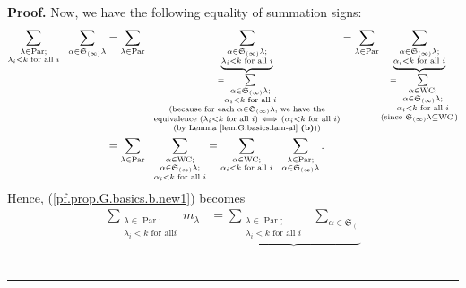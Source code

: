 \documentclass[numbers=enddot,12pt,final,onecolumn,notitlepage]{scrartcl}%
\theoremstyle{definition}
\newenvironment{proof}[1][Proof]{\noindent\textbf{#1.} }{\ \rule{0.5em}{0.5em}}
\let\sumnonlimits\sum
\renewcommand{\sum}{\sumnonlimits\limits}
\newenvironment{verlong}{}{}
\begin{document}
\begin{verlong}
\begin{proof}
Now, we have the following equality of summation signs:%
\begin{align*}
\sum_{\substack{\lambda\in\operatorname*{Par};\\\lambda_{i}<k\text{ for all
}i}}\ \ \sum_{\alpha\in\mathfrak{S}_{\left(  \infty\right)  }\lambda}  &
=\sum_{\lambda\in\operatorname*{Par}}\ \ \underbrace{\sum_{\substack{\alpha
\in\mathfrak{S}_{\left(  \infty\right)  }\lambda;\\\lambda_{i}<k\text{ for all
}i}}}_{\substack{=\sum_{\substack{\alpha\in\mathfrak{S}_{\left(
\infty\right)  }\lambda;\\\alpha_{i}<k\text{ for all }i}}\\\text{(because for
each }\alpha\in\mathfrak{S}_{\left(  \infty\right)  }\lambda\text{, we have
the}\\\text{equivalence }\left(  \lambda_{i}<k\text{ for all }i\right)
\ \Longleftrightarrow\ \left(  \alpha_{i}<k\text{ for all }i\right)
\\\text{(by Lemma \ref{lem.G.basics.lam-al} \textbf{(b)}))}}}=\sum_{\lambda
\in\operatorname*{Par}}\underbrace{\sum_{\substack{\alpha\in\mathfrak{S}%
_{\left(  \infty\right)  }\lambda;\\\alpha_{i}<k\text{ for all }i}%
}}_{\substack{=\sum_{\substack{\alpha\in\operatorname*{WC};\\\alpha
\in\mathfrak{S}_{\left(  \infty\right)  }\lambda;\\\alpha_{i}<k\text{ for all
}i}}\\\text{(since }\mathfrak{S}_{\left(  \infty\right)  }\lambda
\subseteq\operatorname*{WC}\text{)}}}\\
&  =\sum_{\lambda\in\operatorname*{Par}}\ \ \sum_{\substack{\alpha
\in\operatorname*{WC};\\\alpha\in\mathfrak{S}_{\left(  \infty\right)  }%
\lambda;\\\alpha_{i}<k\text{ for all }i}}=\sum_{\substack{\alpha
\in\operatorname*{WC};\\\alpha_{i}<k\text{ for all }i}}\ \ \sum
_{\substack{\lambda\in\operatorname*{Par};\\\alpha\in\mathfrak{S}_{\left(
\infty\right)  }\lambda}}.
\end{align*}
Hence, (\ref{pf.prop.G.basics.b.new1}) becomes%
\begin{align}
\sum_{\substack{\lambda\in\operatorname*{Par};\\\lambda_{i}<k\text{ for all
}i}}m_{\lambda}  &  =\underbrace{\sum_{\substack{\lambda\in\operatorname*{Par}%
;\\\lambda_{i}<k\text{ for all }i}}\ \ \sum_{\alpha\in\mathfrak{S}_{\left(
}}}
\end{align}
\end{proof}
\end{verlong}
\end{document}
